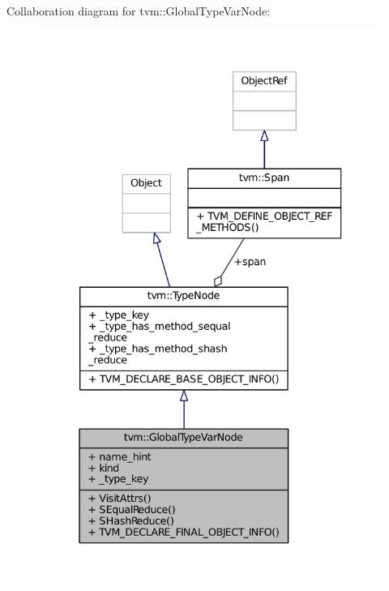 Collaboration diagram for tvm\+:\+:Global\+Type\+Var\+Node\+:
\nopagebreak
\begin{figure}[H]
\begin{center}
\leavevmode
\includegraphics[width=337pt]{classtvm_1_1GlobalTypeVarNode__coll__graph}
\end{center}
\end{figure}
